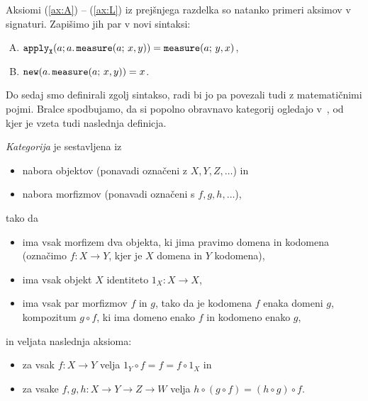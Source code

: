 \begin{example}
    Aksiomi (\ref{ax:A}) – (\ref{ax:L}) iz prejšnjega razdelka so natanko primeri aksimov v signaturi.
    Zapišimo jih par v novi sintaksi:
    \begin{enumerate}[(A)]
        \item \( \textnormal{\ttfamily apply}_{\mathtt{X}}{\left( {a;a.\,\textnormal{\ttfamily measure}{\left( {a;\,x,y} \right)}} \right)} = \textnormal{\ttfamily measure}{\left( {a;\,y,x} \right)} \),
        \addtocounter{enumi}{2}
        \item \( \textnormal{\ttfamily new}{\left( {a.\,\textnormal{\ttfamily measure}{\left( {a;\,x,y} \right)}} \right)} = x \).\qedhere
    \end{enumerate}
\end{example}

Do sedaj smo definirali zgolj sintakso, radi bi jo pa povezali tudi z matematičnimi pojmi.
Bralce spodbujamo, da si popolno obravnavo kategorij ogledajo v~\cite{eriehl}, od kjer je vzeta tudi naslednja definicja.

\begin{definition}
    \emph{Kategorija} je sestavljena iz
    \begin{itemize}
        \item nabora objektov (ponavadi označeni z \(X,Y,Z,…\)) in
        \item nabora morfizmov (ponavadi označeni s \(f,g,h,…\)),
    \end{itemize}
    tako da
    \begin{itemize}
        \item ima vsak morfizem dva objekta, ki jima pravimo domena in kodomena (označimo \(f : X → Y\), kjer je \(X\) domena in \(Y\) kodomena),
        \item ima vsak objekt \(X\) identiteto \(1_X : X → X\),
        \item ima vsak par morfizmov \(f\) in \(g\), tako da je kodomena \(f\) enaka domeni \(g\), kompozitum \(g∘f\), ki ima domeno enako \(f\) in kodomeno enako \(g\),
    \end{itemize}
    in veljata naslednja aksioma:
    \begin{itemize}
        \item za vsak \(f : X → Y\) velja \(1_Y∘f = f = f∘1_X\) in
        \item za vsake \(f,g,h : X → Y → Z → W\) velja \(h∘(g∘f) = (h∘g)∘f\).
    \end{itemize}
\end{definition}

